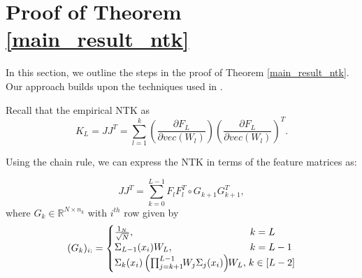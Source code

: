 \documentclass{article}
\theoremstyle{plain}
\newtheorem{Theorem}{Theorem}[section]
\theoremstyle{definition}
\theoremstyle{remark}
\newcommand\R{\mathbb{R}}
\begin{document}

    


\section{Proof of Theorem \ref{main_result_ntk}}


In this section, we outline the steps in the proof of Theorem \ref{main_result_ntk}. Our approach builds upon the techniques used in
\cite{nguyen2021tight}.

Recall that the empirical NTK as
\begin{equation*}
    K_L = JJ^T = \sum_{l=1}^k\left(\frac{\partial F_L}{\partial vec(W_l)}\right)
    \left(\frac{\partial F_L}{\partial vec(W_l)}\right)^T.
\end{equation*}

Using the chain rule, we can express the NTK in terms of the feature matrices as:

\begin{equation}\label{ntk_decomp}
    JJ^T = \sum_{k=0}^{L-1}F_lF_l^T\circ G_{k+1}G_{k+1}^T, 
\end{equation}
where $G_k \in \R^{N\times n_k}$ with $i^{th}$ row given by
\begin{equation*}
    (G_k)_{i:} =
    \begin{cases}
    \frac{1_N}{\sqrt{N}}, & \hspace{-0.2cm} k = L \\
    \Sigma_{L-1}(x_i)W_L, & \hspace{-0.2cm} k = L-1 \\
    \Sigma_k(x_i)\left(\prod_{j=k+1}^{L-1}\hspace{-0.1cm}W_j\Sigma_j(x_i)
    \right)
    \hspace{-0.1cm}W_L, & 
    \hspace{-0.25cm} k \in [L-2]
    \end{cases}
\end{equation*}
\end{document}
